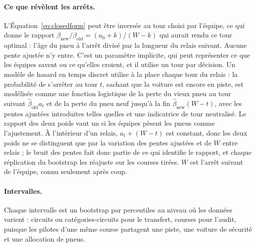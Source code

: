 \documentclass[11pt,a4paper]{article}
\begin{document}
\paragraph{Ce que révèlent les arrêts.} L'Équation~\ref{eq:closedform} peut être
inversée au tour choisi par l'équipe, ce qui donne le rapport
$\beta_{\mathrm{new}}/\beta_{\mathrm{old}} = (a_0+k)/(W-k)$ qui aurait rendu ce
tour optimal : l'âge du pneu à l'arrêt divisé par la longueur du relais
suivant. Aucune pente ajustée n'y entre. C'est un paramètre implicite, qui peut
représenter ce que les équipes savent ou ce qu'elles croient, et il utilise un
tour par décision. Un modèle de hasard en temps discret utilise
à la place chaque tour du relais : la probabilité de s'arrêter au tour $t$,
sachant que la voiture est encore en piste, est modélisée comme une fonction
logistique de la perte du vieux pneu au tour suivant $\hat\beta_{\mathrm{old}}a_t$
et de la perte du pneu neuf jusqu'à la fin $\hat\beta_{\mathrm{new}}(W-t)$, avec
les pentes ajustées introduites telles quelles et une indicatrice de tour
neutralisé. Le rapport des deux poids vaut un si les équipes pèsent les pneus
comme l'ajustement. À l'intérieur d'un relais, $a_t + (W-t)$ est constant, donc
les deux poids ne se distinguent que par la variation des pentes ajustées et de
$W$ entre relais ; le bruit des pentes fait donc partie de ce qui identifie le
rapport, et chaque réplication du bootstrap les réajuste sur les courses tirées.
$W$ est l'arrêt suivant de l'équipe, connu seulement après coup.

\paragraph{Intervalles.} Chaque intervalle est un bootstrap par percentiles au
niveau où les données varient : circuits ou catégories-circuits pour le
transfert, courses pour l'audit, puisque les pilotes d'une même course partagent
une piste, une voiture de sécurité et une allocation de pneus.
\end{document}
